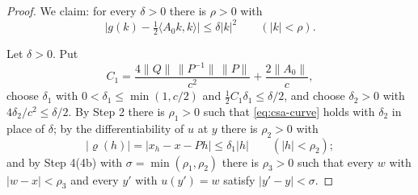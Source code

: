 \begin{proof}
We claim: for every $\delta>0$ there is $\rho>0$ with
\begin{equation}\label{eq:csa-goal}
  \bigl|g(k)-\tfrac12\langle A_0k,k\rangle\bigr|\le\delta|k|^2\qquad(|k|<\rho).
\end{equation}

Let $\delta>0$. Put
\[
  C_1=\frac{4\|Q\|\,\|P^{-1}\|\,\|P\|}{c^2}+\frac{2\|A_0\|}{c},
\]
choose $\delta_1$ with $0<\delta_1\le\min(1,c/2)$ and
$\tfrac12C_1\delta_1\le\delta/2$, and choose $\delta_2>0$ with
$4\delta_2/c^2\le\delta/2$. By Step 2 there is $\rho_1>0$ such that
\eqref{eq:csa-curve} holds with $\delta_2$ in place of $\delta$; by the
differentiability of $u$ at $y$ there is $\rho_2>0$ with
\begin{equation}\label{eq:csa-rho}
  |\varrho(h)|=|x_h-x-Ph|\le\delta_1|h|\qquad(|h|<\rho_2);
\end{equation}
and by Step 4(4b) with $\sigma=\min(\rho_1,\rho_2)$ there is $\rho_3>0$ such
that every $w$ with $|w-x|<\rho_3$ and every $y'$ with $u(y')=w$ satisfy
$|y'-y|<\sigma$.


\end{proof}
